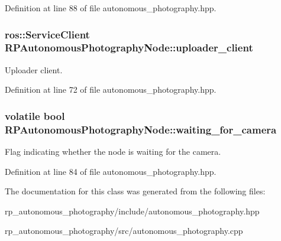 \-Definition at line 88 of file autonomous\-\_\-photography.\-hpp.

\hypertarget{class_r_p_autonomous_photography_node_aaca249845b8cd8c5376fdb8d5ff3f544}{
\subsubsection[{uploader\-\_\-client}]{\setlength{\rightskip}{0pt plus 5cm}ros\-::\-Service\-Client {\bf \-R\-P\-Autonomous\-Photography\-Node\-::uploader\-\_\-client}}}\label{class_r_p_autonomous_photography_node_aaca249845b8cd8c5376fdb8d5ff3f544}
\-Uploader client. 

\-Definition at line 72 of file autonomous\-\_\-photography.\-hpp.

\hypertarget{class_r_p_autonomous_photography_node_a91af5773992cc4767fb0f2737449c6f0}{
\subsubsection[{waiting\-\_\-for\-\_\-camera}]{\setlength{\rightskip}{0pt plus 5cm}volatile bool {\bf \-R\-P\-Autonomous\-Photography\-Node\-::waiting\-\_\-for\-\_\-camera}}}\label{class_r_p_autonomous_photography_node_a91af5773992cc4767fb0f2737449c6f0}
\-Flag indicating whether the node is waiting for the camera. 

\-Definition at line 84 of file autonomous\-\_\-photography.\-hpp.



\-The documentation for this class was generated from the following files\-:\begin{DoxyCompactItemize}
\item 
rp\-\_\-autonomous\-\_\-photography/include/autonomous\-\_\-photography.\-hpp\item 
rp\-\_\-autonomous\-\_\-photography/src/autonomous\-\_\-photography.\-cpp\end{DoxyCompactItemize}
